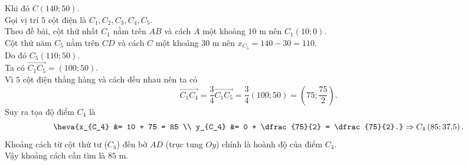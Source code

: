 \begin{ex}
{	Khi đó $C\left(140; 50\right)$.\\
	Gọi vị trí $5$ cột điện là $C_1, C_2, C_3, C_4, C_5$.\\
	Theo đề bài, cột thứ nhất $C_1$ nằm trên $AB$ và cách $A$ một khoảng $10\text{ m}$ nên $C_1\left(10; 0\right)$.\\
	Cột thứ năm $C_5$ nằm trên $CD$ và cách $C$ một khoảng $30\text{ m}$ nên $x_{C_5} = 140 - 30 = 110$.\\
	Do đó $C_5\left(110; 50\right)$.\\
	Ta có $\overrightarrow{C_1C_5} = \left(100; 50\right)$.\\
	Vì $5$ cột điện thẳng hàng và cách đều nhau nên ta có
	\[ \overrightarrow{C_1C_4} = \dfrac{3}{4}\overrightarrow{C_1C_5} = \dfrac{3}{4}\left(100; 50\right) = \left(75; \dfrac{75}{2}\right). \]
	Suy ra tọa độ điểm $C_4$ là
	\[ \heva{x_{C_4} &= 10 + 75 = 85 \\ y_{C_4} &= 0 + \dfrac{75}{2} = \dfrac{75}{2}.} \Rightarrow C_4\left(85; 37{,}5\right). \]
	Khoảng cách từ cột thứ tư ($C_4$) đến bờ $AD$ (trục tung $Oy$) chính là hoành độ của điểm $C_4$.\\
	Vậy khoảng cách cần tìm là $85\text{ m}$.
	}
\end{ex}
